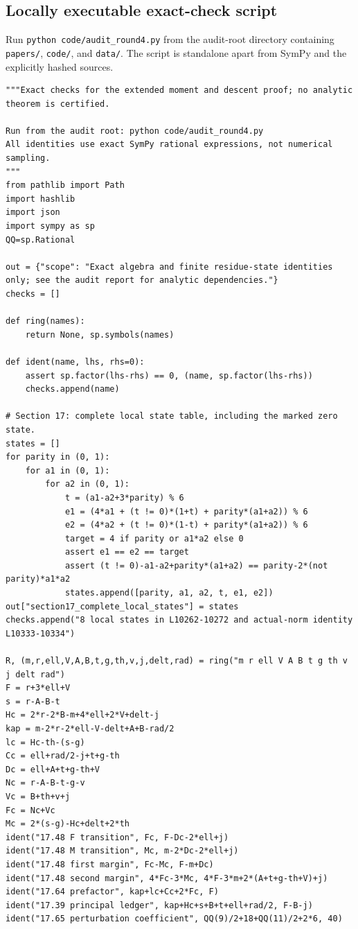 \documentclass[12pt]{article}
\begin{document}
\subsection{Locally executable exact-check script}
Run \texttt{python code/audit\_round4.py} from the audit-root
directory containing \texttt{papers/}, \texttt{code/}, and
\texttt{data/}.  The script is standalone apart from SymPy and
the explicitly hashed sources.

\begin{verbatim}
"""Exact checks for the extended moment and descent proof; no analytic theorem is certified.

Run from the audit root: python code/audit_round4.py
All identities use exact SymPy rational expressions, not numerical sampling.
"""
from pathlib import Path
import hashlib
import json
import sympy as sp
QQ=sp.Rational

out = {"scope": "Exact algebra and finite residue-state identities only; see the audit report for analytic dependencies."}
checks = []

def ring(names):
    return None, sp.symbols(names)

def ident(name, lhs, rhs=0):
    assert sp.factor(lhs-rhs) == 0, (name, sp.factor(lhs-rhs))
    checks.append(name)

# Section 17: complete local state table, including the marked zero state.
states = []
for parity in (0, 1):
    for a1 in (0, 1):
        for a2 in (0, 1):
            t = (a1-a2+3*parity) % 6
            e1 = (4*a1 + (t != 0)*(1+t) + parity*(a1+a2)) % 6
            e2 = (4*a2 + (t != 0)*(1-t) + parity*(a1+a2)) % 6
            target = 4 if parity or a1*a2 else 0
            assert e1 == e2 == target
            assert (t != 0)-a1-a2+parity*(a1+a2) == parity-2*(not parity)*a1*a2
            states.append([parity, a1, a2, t, e1, e2])
out["section17_complete_local_states"] = states
checks.append("8 local states in L10262-10272 and actual-norm identity L10333-10334")

R, (m,r,ell,V,A,B,t,g,th,v,j,delt,rad) = ring("m r ell V A B t g th v j delt rad")
F = r+3*ell+V
s = r-A-B-t
Hc = 2*r-2*B-m+4*ell+2*V+delt-j
kap = m-2*r-2*ell-V-delt+A+B-rad/2
lc = Hc-th-(s-g)
Cc = ell+rad/2-j+t+g-th
Dc = ell+A+t+g-th+V
Nc = r-A-B-t-g-v
Vc = B+th+v+j
Fc = Nc+Vc
Mc = 2*(s-g)-Hc+delt+2*th
ident("17.48 F transition", Fc, F-Dc-2*ell+j)
ident("17.48 M transition", Mc, m-2*Dc-2*ell+j)
ident("17.48 first margin", Fc-Mc, F-m+Dc)
ident("17.48 second margin", 4*Fc-3*Mc, 4*F-3*m+2*(A+t+g-th+V)+j)
ident("17.64 prefactor", kap+lc+Cc+2*Fc, F)
ident("17.39 principal ledger", kap+Hc+s+B+t+ell+rad/2, F-B-j)
ident("17.65 perturbation coefficient", QQ(9)/2+18+QQ(11)/2+2*6, 40)


\end{verbatim}
\end{document}

